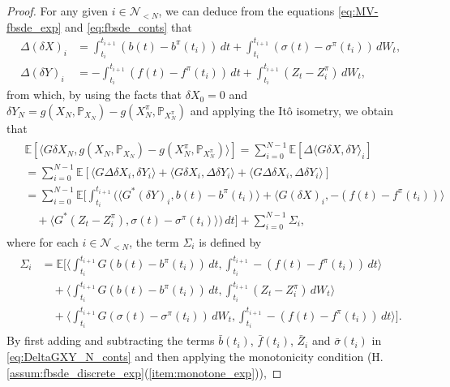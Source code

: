 \documentclass[11pt]{article}
\numberwithin{equation}{section}
\theoremstyle{definition}
\theoremstyle{remark}
\def\l{\label}  \def\f{\frac}  \def\fa{\forall}
\def \la{\langle} \def\ra{\rangle}
\def\cN{\mathcal{N}}
\def\sE{{\mathbb{E}}}
\def\sP{\mathbb{P}}
\begin{document}
\begin{proof}
For any given $i\in \cN_{<N}$, 
we can deduce from 
the equations \eqref{eq:MV-fbsde_exp} and \eqref{eq:fbsde_conts}
that
\begin{align}
\Delta (\delta {X})_{i}
&=
\int_{t_i}^{t_{i+1}}(b(t)-{b}^\pi(t_{i}))\,dt +
\int_{t_i}^{t_{i+1}}(\sigma(t)-{\sigma}^\pi(t_i))\,d W_t,
\label{eq:difference_fwd}
\\
\Delta (\delta {Y})_{i}
&=
-\int_{t_i}^{t_{i+1}}(f(t)-{f}^\pi(t_{i}))\,dt+\int_{t_i}^{t_{i+1}} ({Z}_t-Z^\pi_i)\,d W_t,
\label{eq:difference_bwd}
\end{align}
from which, by using the facts that $\delta X_0=0$ and
$\delta Y_N=g(X_N,\sP_{X_N})-g(X^\pi_N,\sP_{X^\pi_N})$
and applying 
 the It\^{o} isometry, we obtain that 
\begin{align}\l{eq:DeltaGXY_N_conts}
\begin{split}
&\sE[\la G\delta X_N,g(X_N,\sP_{X_N})-g(X^\pi_N,\sP_{X^\pi_N})\ra]
 =\sum_{i=0}^{N-1}\sE[\Delta\la G\delta X,\delta Y\ra_i]
\\
&
=\sum_{i=0}^{N-1} \sE[\la G\Delta \delta X_i, \delta Y_i\ra
+\la G \delta X_i, \Delta \delta Y_i\ra
+\la G \Delta\delta X_i, \Delta \delta Y_i\ra]
\\
&
=\sum_{i=0}^{N-1}
\sE\bigg[ \int_{t_i}^{t_{i+1}}
\bigg(\la G^*(\delta Y)_{i},
b(t)-{b}^\pi(t_{i})\ra 
+
\la G(\delta X)_{i},-(f(t)-{f}^\pi(t_{i}))\ra
\\
&\quad
+\la G^*({Z}_t-Z^\pi_i), \sigma(t)-{\sigma}^\pi(t_i)
\ra
\bigg) \,dt\bigg]
+\sum_{i=0}^{N-1}{\Sigma_i},
\end{split}
\end{align}
where for each $i\in \cN_{<N}$, the term $\Sigma_i$ is defined by
\begin{align}\l{eq:Sigma_i_conts}
\begin{split}
{\Sigma_i}
&=
\sE\bigg[
\bigg\la 
\int_{t_i}^{t_{i+1}}G(b(t)-{b}^\pi(t_{i}))\,dt,\int_{t_i}^{t_{i+1}}-(f(t)-{f}^\pi(t_{i}))\,dt
\bigg\ra
\\
&\quad 
+\bigg\la 
\int_{t_i}^{t_{i+1}}G(b(t)-{b}^\pi(t_{i}))\,dt,\int_{t_i}^{t_{i+1}} ({Z}_t-Z^\pi_i)\,d W_t
\bigg\ra
\\
&\quad
+\bigg\la 
\int_{t_i}^{t_{i+1}}G(\sigma(t)-{\sigma}^\pi(t_i))\,d W_t,\int_{t_i}^{t_{i+1}}-(f(t)-{f}^\pi(t_{i}))\,dt
\bigg\ra
\bigg].
\end{split}
\end{align}
By first adding and subtracting the terms $\bar{b}(t_i)$, $\bar{f}(t_i)$,  $\bar{Z}_i$ and $\bar{\sigma}(t_i)$
in \eqref{eq:DeltaGXY_N_conts} and then applying the monotonicity condition (H.\ref{assum:fbsde_discrete_exp}(\ref{item:monotone_exp})),

\end{proof}
\end{document}
